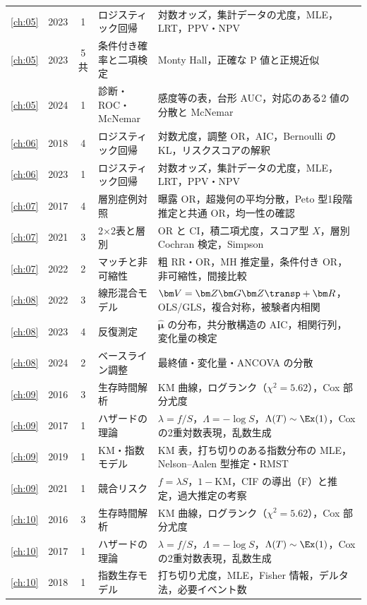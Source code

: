 \begin{center}
\begin{longtable}{@{}cccL{36mm}L{78mm}@{}}
\ref{ch:05} & 2023 & 1 & ロジスティック回帰 & 対数オッズ，集計データの尤度，MLE，LRT，PPV・NPV\\
\ref{ch:05} & 2023 & 5共 & 条件付き確率と二項検定 & Monty Hall，正確な P 値と正規近似\\
\ref{ch:05} & 2024 & 1 & 診断・ROC・McNemar & 感度等の表，台形 AUC，対応のある2 値の分散と McNemar\\
\midrule
\ref{ch:06} & 2018 & 4 & ロジスティック回帰 & 対数尤度，調整 OR，AIC，Bernoulli の KL，リスクスコアの解釈\\
\ref{ch:06} & 2023 & 1 & ロジスティック回帰 & 対数オッズ，集計データの尤度，MLE，LRT，PPV・NPV\\
\midrule
\ref{ch:07} & 2017 & 4 & 層別症例対照 & 曝露 OR，超幾何の平均分散，Peto 型1段階推定と共通 OR，均一性の確認\\
\ref{ch:07} & 2021 & 3 & 2×2表と層別 & OR と CI，積二項尤度，スコア型 $X$，層別 Cochran 検定，Simpson\\
\ref{ch:07} & 2022 & 2 & マッチと非可縮性 & 粗 RR・OR，MH 推定量，条件付き OR，非可縮性，間接比較\\
\midrule
\ref{ch:08} & 2022 & 3 & 線形混合モデル & $\bm V=\bm Z\bm G\bm Z\transp+\bm R$，OLS/GLS，複合対称，被験者内相関\\
\ref{ch:08} & 2023 & 4 & 反復測定 & $\hat{\bm\mu}$ の分布，共分散構造の AIC，相関行列，変化量の検定\\
\ref{ch:08} & 2024 & 2 & ベースライン調整 & 最終値・変化量・ANCOVA の分散\\
\midrule
\ref{ch:09} & 2016 & 3 & 生存時間解析 & KM 曲線，ログランク（$\chi^2=5.62$），Cox 部分尤度\\
\ref{ch:09} & 2017 & 1 & ハザードの理論 & $\lambda=f/S$，$\Lambda=-\log S$，$\Lambda(T)\sim\Ex(1)$，Cox の2重対数表現，乱数生成\\
\ref{ch:09} & 2019 & 1 & KM・指数モデル & KM 表，打ち切りのある指数分布の MLE，Nelson--Aalen 型推定・RMST\\
\ref{ch:09} & 2021 & 1 & 競合リスク & $f=\lambda S$，$1-$KM，CIF の導出（F）と推定，過大推定の考察\\
\midrule
\ref{ch:10} & 2016 & 3 & 生存時間解析 & KM 曲線，ログランク（$\chi^2=5.62$），Cox 部分尤度\\
\ref{ch:10} & 2017 & 1 & ハザードの理論 & $\lambda=f/S$，$\Lambda=-\log S$，$\Lambda(T)\sim\Ex(1)$，Cox の2重対数表現，乱数生成\\
\ref{ch:10} & 2018 & 1 & 指数生存モデル & 打ち切り尤度，MLE，Fisher 情報，デルタ法，必要イベント数\\

\end{longtable}
\end{center}
